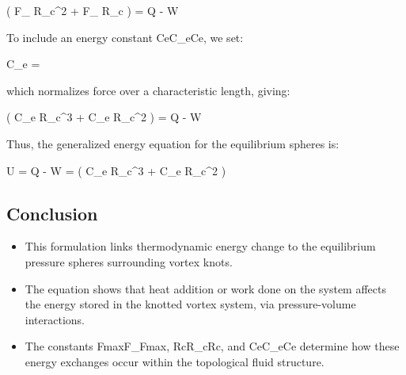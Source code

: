 \Delta \left(  \pi F_{\max} R_c^2 +  F_{\max} R_c \right) = Q - W

To include an energy constant CeC_eCe​, we set:

C_e = 

which normalizes force over a characteristic length, giving:

\Delta \left(  \pi C_e R_c^3 +  C_e R_c^2 \right) = Q - W

Thus, the generalized energy equation for the equilibrium spheres is:

\Delta U = Q - W = \Delta \left(  \pi C_e R_c^3 +  C_e R_c^2 \right)



\subsection*{Conclusion}
\begin{itemize}
\item This formulation links thermodynamic energy change to the equilibrium pressure spheres surrounding vortex knots.


\item The equation shows that heat addition or work done on the system affects the energy stored in the knotted vortex system, via pressure-volume interactions.


\item The constants Fmax⁡F_{\max}Fmax​, RcR_cRc​, and CeC_eCe​ determine how these energy exchanges occur within the topological fluid structure.


\end{itemize}


